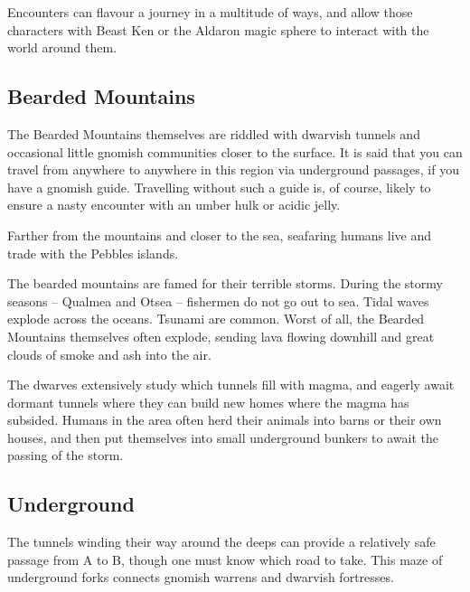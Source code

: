Encounters can flavour a journey in a multitude of ways, and allow those characters with Beast Ken or the Aldaron magic sphere to interact with the world around them.

\subsection{Bearded Mountains}

The Bearded Mountains themselves are riddled with dwarvish tunnels and occasional little gnomish communities closer to the surface.  It is said that you can travel from anywhere to anywhere in this region via underground passages, if you have a gnomish guide.  Travelling without such a guide is, of course, likely to ensure a nasty encounter with an umber hulk or acidic jelly.

Farther from the mountains and closer to the sea, seafaring humans live and trade with the Pebbles islands.

The bearded mountains are famed for their terrible storms.  During the stormy seasons -- Qualmea and Otsea -- fishermen do not go out to sea.  Tidal waves explode across the oceans.  Tsunami are common.  Worst of all, the Bearded Mountains themselves often explode, sending lava flowing downhill and great clouds of smoke and ash into the air.

The dwarves extensively study which tunnels fill with magma, and eagerly await dormant tunnels where they can build new homes where the magma has subsided.  Humans in the area often herd their animals into barns or their own houses, and then put themselves into small underground bunkers to await the passing of the storm.

\subsection{Underground}
The tunnels winding their way around the deeps can provide a relatively safe passage from A to B, though one must know which road to take.  This maze of underground forks connects gnomish warrens and dwarvish fortresses.

\label{bearded_encounters}

